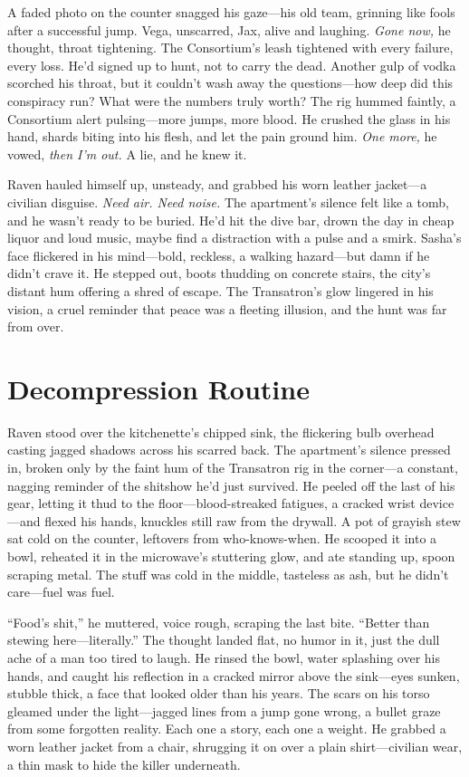\documentclass[12pt]{book}
\begin{document}
A faded photo on the counter snagged his gaze---his old team, grinning like fools after a successful jump. Vega, unscarred, Jax, alive and laughing. \textit{Gone now,} he thought, throat tightening. The Consortium’s leash tightened with every failure, every loss. He’d signed up to hunt, not to carry the dead. Another gulp of vodka scorched his throat, but it couldn’t wash away the questions---how deep did this conspiracy run? What were the numbers truly worth? The rig hummed faintly, a Consortium alert pulsing---more jumps, more blood. He crushed the glass in his hand, shards biting into his flesh, and let the pain ground him. \textit{One more,} he vowed, \textit{then I’m out.} A lie, and he knew it.

Raven hauled himself up, unsteady, and grabbed his worn leather jacket---a civilian disguise. \textit{Need air. Need noise.} The apartment’s silence felt like a tomb, and he wasn’t ready to be buried. He’d hit the dive bar, drown the day in cheap liquor and loud music, maybe find a distraction with a pulse and a smirk. Sasha’s face flickered in his mind---bold, reckless, a walking hazard---but damn if he didn’t crave it. He stepped out, boots thudding on concrete stairs, the city’s distant hum offering a shred of escape. The Transatron’s glow lingered in his vision, a cruel reminder that peace was a fleeting illusion, and the hunt was far from over.

\section{Decompression Routine}

Raven stood over the kitchenette’s chipped sink, the flickering bulb overhead casting jagged shadows across his scarred back. The apartment’s silence pressed in, broken only by the faint hum of the Transatron rig in the corner—a constant, nagging reminder of the shitshow he’d just survived. He peeled off the last of his gear, letting it thud to the floor—blood-streaked fatigues, a cracked wrist device—and flexed his hands, knuckles still raw from the drywall. A pot of grayish stew sat cold on the counter, leftovers from who-knows-when. He scooped it into a bowl, reheated it in the microwave’s stuttering glow, and ate standing up, spoon scraping metal. The stuff was cold in the middle, tasteless as ash, but he didn’t care—fuel was fuel.

“Food’s shit,” he muttered, voice rough, scraping the last bite. “Better than stewing here—literally.” The thought landed flat, no humor in it, just the dull ache of a man too tired to laugh. He rinsed the bowl, water splashing over his hands, and caught his reflection in a cracked mirror above the sink—eyes sunken, stubble thick, a face that looked older than his years. The scars on his torso gleamed under the light—jagged lines from a jump gone wrong, a bullet graze from some forgotten reality. Each one a story, each one a weight. He grabbed a worn leather jacket from a chair, shrugging it on over a plain shirt—civilian wear, a thin mask to hide the killer underneath.
\end{document}
